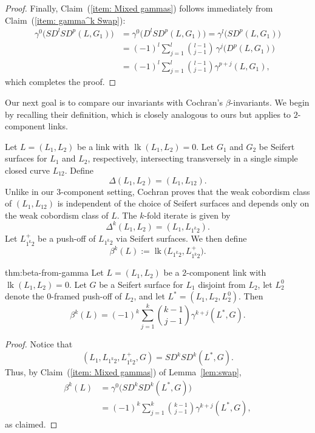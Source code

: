 \documentclass[a4paper, 11pt]{amsart}
\newtheorem{theorem}{Theorem}[section]
\theoremstyle{definition}
\newcommand{\lk}{\operatorname{lk}}
\newcommand{\Swap}{S}%
\newcommand{\pref}[1]{(\ref{#1})}
\begin{document}
\begin{proof}
Finally, Claim~\pref{item: Mixed gammas} follows immediately from Claim~\pref{item: gamma^k Swap}:
\begin{align*}
\gamma^0\bigl(\Swap D^l\Swap D^p(L,G_1)\bigr)
&=\gamma^0\bigl(D^l\Swap D^p(L,G_1)\bigr)=\gamma^l\bigl(\Swap D^p(L,G_1)\bigr) \\
&=(-1)^{l}\sum_{j=1}^{l} {l-1 \choose j-1}\,
\gamma^j\bigl(D^p(L,G_1)\bigr) \\
&=(-1)^l\sum_{j=1}^{l} {l-1 \choose j-1}\gamma^{p+j}(L,G_1),
\end{align*}
which completes the proof.
\end{proof}



Our next goal is to compare our invariants with Cochran's $\beta$-invariants. We begin by recalling their definition, which is closely analogous to ours but applies to $2$-component links.

Let $L=(L_1,L_2)$ be a link with $\lk(L_1,L_2)=0$. Let $G_1$ and $G_2$ be Seifert surfaces for $L_1$ and $L_2$, respectively, intersecting transversely in a single simple closed curve $L_{12}$. Define
\[
\Delta(L_1,L_2)=(L_1,L_{12}).
\]
Unlike in our $3$-component setting, Cochran proves that the weak cobordism class of $(L_1,L_{12})$ is independent of the choice of Seifert surfaces and depends only on the weak cobordism class of $L$. The $k$-fold iterate is given by
\[
\Delta^k(L_1,L_2)=(L_1,L_{1^k2}).
\]
Let $L_{1^k2}^+$ be a push-off of $L_{1^k2}$ via Seifert surfaces. We then define
\[
\beta^k(L):=\lk\bigl(L_{1^k2},L_{1^k2}^+\bigr).
\]

\begin{reptheorem}{thm:beta-from-gamma}
Let $L=(L_1,L_2)$ be a $2$-component link with $\lk(L_1,L_2)=0$. Let $G$ be a Seifert surface for
$L_1$ disjoint from $L_2$, let $L_2^0$ denote the $0$-framed push-off of $L_2$, and let
$L^\ast=(L_1,L_2,L_2^0)$. Then
\[
\beta^k(L)=(-1)^k\sum_{j=1}^k \binom{k-1}{j-1}\gamma^{k+j}(L^\ast,G).
\]
\end{reptheorem}


\begin{proof}
Notice that
\[
(L_1, L_{1^k2}, L_{1^k2}^+, G)=\Swap D^k \Swap D^k(L^*,G).
\]
Thus, by Claim~\pref{item: Mixed gammas} of Lemma~\ref{lem:swap},
\begin{align*}
\beta^k(L)
&=\gamma^0\bigl(\Swap D^k \Swap D^k(L^*,G)\bigr) \\
&=(-1)^k\sum_{j=1}^{k}{k-1\choose j-1}\gamma^{k+j}(L^*,G),
\end{align*}
as claimed.
\end{proof}
\end{document}
